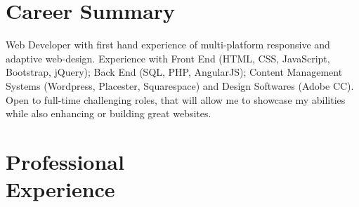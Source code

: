 \documentclass[margin,line]{res}
\begin{document}
\begin{resume} 
 


\section{Career Summary}

Web Developer with first hand experience of multi-platform responsive and adaptive web-design. Experience with Front End (HTML, CSS, JavaScript, Bootstrap, jQuery); Back End (SQL, PHP, AngularJS); Content Management Systems (Wordpress, Placester, Squarespace) and Design Softwares (Adobe CC). Open to full-time challenging roles, that will allow me to showcase my abilities while also enhancing or building great websites.

\section{Professional \\Experience}


\end{resume}
\end{document}
